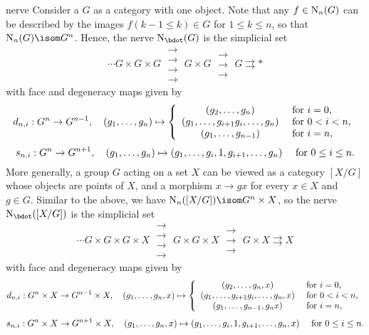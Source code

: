 \begin{example}{nerve}
    Consider a  $G$ as a category with one object. Note that any $f \in \textup{N}_n(G)$ can be described by the images $f(k - 1 \le k) \in G$ for $1 \le k \le n$, so that $\textup{N}_n(G) \isom G^n$. Hence, the nerve $\textup{N}_\bdot(G)$ is the simplicial set
    \[ \cdots G \times G \times G \; \substack{\rightarrow \\[-0.9em] \rightarrow \\[-0.9em] \rightarrow \\[-0.9em] \rightarrow} \; G \times G \; \substack{\rightarrow \\[-0.9em] \rightarrow \\[-0.9em] \rightarrow} \; G \rightrightarrows * \]
    with face and degeneracy maps given by
    \[ d_{n, i} : G^n \to G^{n - 1}, \quad (g_1, \ldots, g_n) \mapsto \left\{ \begin{array}{cl}
        (g_2, \ldots, g_n) & \textup{ for } i = 0, \\
        (g_1, \ldots, g_{i + 1} g_i, \ldots, g_n) & \textup{ for } 0 < i < n, \\
        (g_1, \ldots, g_{n - 1}) & \textup{ for } i = n,
    \end{array} \right. \]
    \[ s_{n, i} : G^n \to G^{n + 1}, \quad (g_1, \ldots, g_n) \mapsto (g_1, \ldots, g_i, 1, g_{i + 1}, \ldots, g_n) \quad \textup{ for } 0 \le i \le n . \]
    More generally, a group $G$ acting on a set $X$ can be viewed as a category $[X/G]$ whose objects are points of $X$, and a morphism $x \to gx$ for every $x \in X$ and $g \in G$. Similar to the above, we have $\textup{N}_n([X/G]) \isom G^n \times X$, so the nerve $\textup{N}_\bdot([X/G])$ is the simplicial set
    \[ \cdots G \times G \times G \times X \; \substack{\rightarrow \\[-0.9em] \rightarrow \\[-0.9em] \rightarrow \\[-0.9em] \rightarrow} \; G \times G \times X \; \substack{\rightarrow \\[-0.9em] \rightarrow \\[-0.9em] \rightarrow} \; G \times X \rightrightarrows X \]
    with face and degeneracy maps given by
    \[ d_{n, i} : G^n \times X \to G^{n - 1} \times X, \quad (g_1, \ldots, g_n, x) \mapsto \left\{ \begin{array}{cl}
        (g_2, \ldots, g_n, x) & \textup{ for } i = 0, \\
        (g_1, \ldots, g_{i + 1} g_i, \ldots, g_n, x) & \textup{ for } 0 < i < n, \\
        (g_1, \ldots, g_{n - 1}, g_n x) & \textup{ for } i = n,
    \end{array} \right. \]
    \[ s_{n, i} : G^n \times X \to G^{n + 1} \times X, \quad (g_1, \ldots, g_n, x) \mapsto (g_1, \ldots, g_i, 1, g_{i + 1}, \ldots, g_n, x) \quad \textup{ for } 0 \le i \le n . \]
\end{example}

